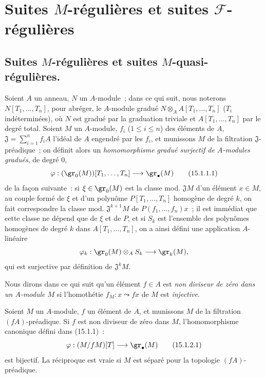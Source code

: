 \section{Suites \texorpdfstring{$M$}{M}-régulières et suites
\texorpdfstring{$\mathscr F$}{F}-régulières}
\label{section:0.15-fr}

\subsection{Suites \texorpdfstring{$M$}{M}-régulières et suites
\texorpdfstring{$M$}{M}-quasi-régulières.}
\label{subsection:0.15.1-fr}
\label{0.15.1-fr}

\begin{env}[15.1.1]
\label{0.15.1.1-fr}
Soient $A$ un anneau, $N$ un $A$-module~; dans ce qui suit, nous noterons
$N[T_1,\ldots,T_n]$, pour abréger, le $A$-module gradué
$N\otimes_A A[T_1,\ldots,T_n]$ ($T_i$ indéterminées), où $N$ est gradué par la
graduation triviale et $A[T_1,\ldots,T_n]$ par le degré total.
Soient $M$ un $A$-module, $f_i$ ($1\leq i\leq n$) des éléments de $A$,
$\mathfrak{J}=\sum_{i=1}^n f_iA$ l'idéal de $A$ engendré par les $f_i$, et
munissons $M$ de la filtration $\mathfrak{J}$-préadique~; on définit alors un
\emph{homomorphisme gradué surjectif de $A$-modules gradués}, de degré $0$,
\[
  \varphi : (\gr_0(M))[T_1,\ldots,T_n]\longrightarrow\gr_\bullet(M)
  \tag{15.1.1.1}\label{0.15.1.1.1-fr}
\]
de la façon suivante~: si $\xi\in\gr_0(M)$ est la classe mod.
$\mathfrak{J}M$ d'un élément $x\in M$, au couple formé de $\xi$ et d'un
polynôme $P[T_1,\ldots,T_n]$ homogène de degré $k$, on fait correspondre la
classe mod. $\mathfrak{J}^{k+1}M$ de $P(f_1,\ldots,f_n)x$~; il est immédiat
que cette classe
ne dépend que de $\xi$ et de $P$, et si $S_k$ est l'ensemble des polynômes
homogènes de degré $k$ dans $A[T_1,\ldots,T_n]$, on a ainsi défini une
application $A$-linéaire
\[
  \varphi_k:\gr_0(M)\otimes_A S_k\longrightarrow\gr_k(M),
\]
qui est surjective par définition de $\mathfrak{J}^kM$.

Nous dirons dans ce qui suit qu'un élément $f\in A$ est \emph{non diviseur de
zéro dans un $A$-module $M$} si l'homothétie $f_M:x\leadsto fx$ de $M$ est
\emph{injective}.
\end{env}

\begin{lemma}[15.1.2]
\label{0.15.1.2-fr}
Soient $M$ un $A$-module, $f$ un élément de $A$, et munissons $M$ de la
filtration $(fA)$-préadique. Si $f$ est non diviseur de zéro dans $M$,
l'homomorphisme canonique défini dans (15.1.1)~:
\[
  \varphi:(M/fM)[T]\longrightarrow\gr_\bullet(M)
  \tag{15.1.2.1}\label{0.15.1.2.1-fr}
\]
est bijectif. La réciproque est vraie si $M$ est séparé pour la topologie
$(fA)$-préadique.
\end{lemma}

